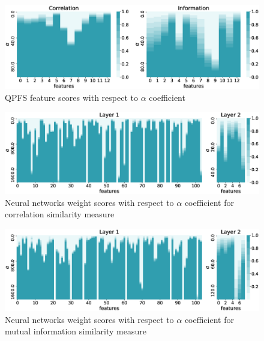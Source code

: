 \documentclass[a4paper,12pt]{article}
\theoremstyle{plain} %
\theoremstyle{definition} %
\theoremstyle{remark} %
\begin{document}
  	\begin{figure}[h]
  		\includegraphics[width=\linewidth]{figs/qpfs_corr_vs_info_wrt_alpha.eps}
  		\caption{QPFS feature scores with respect to $\alpha$ coefficient}
  		\label{fig:qpfs_corr_vs_info_wrt_alpha}
  	\end{figure}
  
   	\begin{figure}[h]
   		\includegraphics[width=\linewidth]{figs/qpfs_nn_corr_wrt_alpha.eps}	 
   		\caption{Neural networks weight scores with respect to $\alpha$ coefficient for correlation similarity measure}
   	\end{figure}	  
   
   \begin{figure}[!h]	
   	\includegraphics[width=\linewidth]{figs/qpfs_nn_info_wrt_alpha.eps}	 
   	\caption{Neural networks weight scores with respect to $\alpha$ coefficient for mutual information similarity measure}
   	\label{fig:qpfs_nn_info_wrt_alpha}
   \end{figure}	
\end{document}
